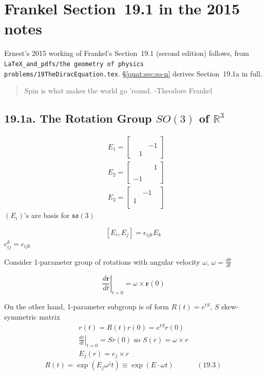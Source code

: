 \section{Frankel Section~19.1 in the 2015 notes}\label{quat:sec:frankel-2015}
Ernest's 2015 working of Frankel's Section~19.1 (second edition) follows, from
\texttt{LaTeX\_and\_pdfs/the geometry of physics problems/19TheDiracEquation.tex}.
\S\ref{quat:sec:so-n} derives Section~19.1a in full.


\begin{quote}
Spin is what makes the world go 'round. -Theodore Frankel
\end{quote}

\subsection{19.1a. The Rotation Group $SO(3)$ of $\mathbb{R}^3$}

\[
\begin{aligned}
  & E_1 = \left[ \begin{matrix} & & \\ 
       & & -1 \\
      & 1 & \end{matrix} \right] \\
  & E_2 = \left[ \begin{matrix} & & 1 \\ 
       & &  \\
     -1  &  & \end{matrix} \right] \\
& E_3 = \left[ \begin{matrix} & -1 & \\ 
     1  & &  \\
      &  & \end{matrix} \right] 
\end{aligned}
\]
$(E_i)$'s are basis for $\mathfrak{so}(3)$

\[
[E_i,E_j] = \epsilon_{ijk}E_k
\]
$c_{ij}^k = \epsilon_{ijk}$

Consider 1-parameter group of rotations with angular velocity $\omega$, $\omega = \frac{d\theta}{dt}$

\[
\left. \frac{d \mathbf{r}}{dt} \right|_{t=0} = \omega \times \mathbf{r}(0)
\]

On the other hand, 1-parameter subgroup is of form $R(t) = e^{tS}$, $S$ skew-symmetric matrix
\[
\begin{gathered}
  r(t) = R(t)r(0) = e^{tS}r(0) \\ 
  \left. \frac{dr}{dt} \right|_{t=0} = Sr(0) \text{ so } S(r) = \omega \times r \\ 
 E_j(r) = e_j \times r
\end{gathered}
\]
\begin{equation}
R(t) = \exp{ (E_j \omega^jt)} \equiv \exp{ (E\cdot \omega t)} \quad \quad \quad \, (19.3) 
\end{equation}

